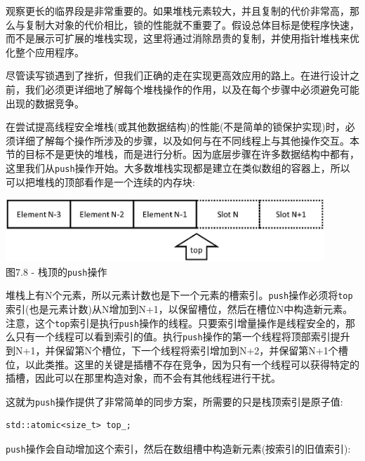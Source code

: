 观察更长的临界段是非常重要的。如果堆栈元素较大，并且复制的代价非常高，那么与复制大对象的代价相比，锁的性能就不重要了。假设总体目标是使程序快速，而不是展示可扩展的堆栈实现，这里将通过消除昂贵的复制，并使用指针堆栈来优化整个应用程序。

尽管读写锁遇到了挫折，但我们正确的走在实现更高效应用的路上。在进行设计之前，我们必须更详细地了解每个堆栈操作的作用，以及在每个步骤中必须避免可能出现的数据竞争。


在尝试提高线程安全堆栈(或其他数据结构)的性能(不是简单的锁保护实现)时，必须详细了解每个操作所涉及的步骤，以及如何与在不同线程上与其他操作交互。本节的目标不是更快的堆栈，而是进行分析。因为底层步骤在许多数据结构中都有，这里我们从\texttt{push}操作开始。大多数堆栈实现都是建立在类似数组的容器上，所以可以把堆栈的顶部看作是一个连续的内存块:

\begin{center}
\includegraphics[width=0.9\textwidth]{content/2/chapter7/images/8.jpg}\\
图7.8 - 栈顶的\texttt{push}操作
\end{center}

堆栈上有N个元素，所以元素计数也是下一个元素的槽索引。\texttt{push}操作必须将\texttt{top}索引(也是元素计数)从N增加到N+1，以保留槽位，然后在槽位N中构造新元素。注意，这个\texttt{top}索引是执行\texttt{push}操作的线程。只要索引增量操作是线程安全的，那么只有一个线程可以看到索引的值。执行\texttt{push}操作的第一个线程将顶部索引提升到N+1，并保留第N个槽位，下一个线程将索引增加到N+2，并保留第N+1个槽位，以此类推。这里的关键是插槽不存在竞争，因为只有一个线程可以获得特定的插槽，因此可以在那里构造对象，而不会有其他线程进行干扰。

这就为\texttt{push}操作提供了非常简单的同步方案，所需要的只是栈顶索引是原子值:

\begin{lstlisting}[style=styleCXX]
std::atomic<size_t> top_;
\end{lstlisting}

\texttt{push}操作会自动增加这个索引，然后在数组槽中构造新元素(按索引的旧值索引):

